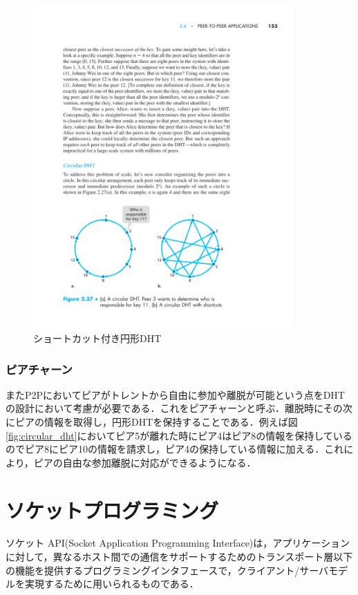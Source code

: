 \documentclass[9pt,a4j,twocolumn]{jsarticle}
\begin{document}
\begin{figure}[tb]
\includegraphics[width=10cm,pagebox=cropbox,clip]{CircularDHTWithShortcuts.pdf}
 \caption{ショートカット付き円形DHT}
 \label{fig:circular_dht_with_shortcuts}
\end{figure}

\subsubsection{ピアチャーン}
またP2Pにおいてピアがトレントから自由に参加や離脱が可能という点をDHTの設計において考慮が必要である．これをピアチャーンと呼ぶ．離脱時にその次にピアの情報を取得し，円形DHTを保持することである．例えば図\ref{fig:circular_dht}においてピア5が離れた時にピア4はピア8の情報を保持しているのでピア8にピア10の情報を請求し，ピア4の保持している情報に加える．これにより，ピアの自由な参加離脱に対応ができるようになる．
\\

\section{ソケットプログラミング}
ソケット API(Socket Application Programming Interface)は，アプリケーションに対して，異なるホスト間での通信をサポートするためのトランスポート層以下の機能を提供するプログラミングインタフェースで，クライアント/サーバモデルを実現するために用いられるものである．


　
\end{document}
